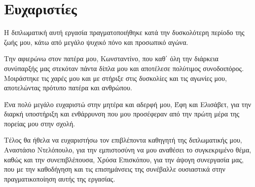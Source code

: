 \thispagestyle{empty}


\section*{Ευχαριστίες}
\thispagestyle{empty}

Η διπλωματική αυτή εργασία πραγματοποιήθηκε κατά την δυσκολότερη περίοδο της ζωής μου, κάτω από μεγάλο ψυχικό πόνο και προσωπικό αγώνα.

Την αφιερώνω στον πατέρα μου, Κωνσταντίνο, που καθ΄ όλη την διάρκεια συνύπαρξής μας 
στεκόταν πάντα δίπλα μου και αποτέλεσε πολύτιμος συνοδοιπόρος. Μοιράστηκε τις χαρές μου και με στήριξε στις δυσκολίες και τις αγωνίες μου, αποτελώντας πρότυπο πατέρα και ανθρώπου.

Ένα πολύ μεγάλο ευχαριστώ στην μητέρα και αδερφή μου, Έφη και Ελισάβετ, για την διαρκή υποστήριξη και ενθάρρυνση που μου προσέφεραν από την πρώτη μέρα της πορείας μου στην σχολή.

Τέλος θα ήθελα να ευχαριστήσω τον επιβλέποντα καθηγητή της διπλωματικής μου, Αναστάσιο Ντελόπουλο, για την εμπιστοσύνη να μου αναθέσει το συγκεκριμένο θέμα, καθώς και την συνεπιβλέπουσα, Χρύσα Επισκόπου, για την άψογη συνεργασία μας, που με την καθοδήγηση και τις επισημάνσεις της συνέβαλλε ουσιαστικά στην πραγματικοποίηση αυτής της εργασίας.

\clearpage
